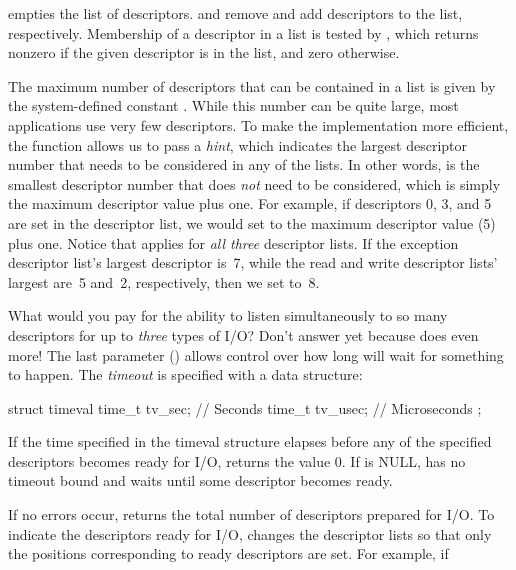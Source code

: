 \noindent {} empties the list of descriptors.
 and  remove
and add descriptors to the list, respectively.
Membership of a descriptor in a list is 
tested by , which returns nonzero if the given
descriptor is in the list, and zero otherwise.

The maximum number of descriptors that can be contained in a list is
given by the system-defined constant .  While this
number can be quite large,
most applications use very few descriptors.  To make the
implementation more efficient, the  function
allows us to pass a \emph{hint}, which indicates the largest
descriptor number that needs to be considered in any of the lists.
In other words,  is the smallest descriptor number
that does \emph{not\/} need to be considered, which is simply
the maximum descriptor value plus one.  For example, if descriptors 0, 3,
and 5 are set in the descriptor list, we would set
 to the maximum
descriptor value (5) plus one.  Notice that 
applies for \emph{all three\/} descriptor lists.
If the exception descriptor list's largest descriptor is~7, while the
read and write descriptor lists' largest are~5 and~2, respectively,
then we set  to~8.

What would you pay for the ability to listen simultaneously to so many
descriptors for up to \emph{three} types of I/O?  Don't answer yet because
 does even more!  The last parameter
() allows control over how long  will wait
for something to happen.  The \emph{timeout} is specified with a 
data structure:

\begin{inlinecode}
struct timeval {
    time_t tv_sec;     // Seconds
    time_t tv_usec;    // Microseconds
};
\end{inlinecode}

\noindent If the time specified in the timeval structure elapses
before any of the specified descriptors becomes ready for I/O,
 returns the value $0$.
If  is NULL,
 has no timeout bound and waits until some
descriptor becomes ready.

If no errors occur,  returns the total number of
descriptors prepared for I/O.  To indicate the descriptors ready for I/O, 
 changes the descriptor lists so that only the
positions corresponding to ready descriptors are set.  For example, if

